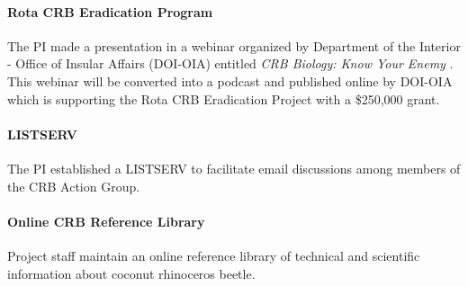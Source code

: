 \documentclass[12pt,letterpaper,english,bibliography=totocnumbered,abstract=on]{scrartcl}
\begin{document}
\paragraph{Rota CRB Eradication Program}
The PI made a presentation in a webinar organized by Department of the Interior - Office of Insular Affairs (DOI-OIA) entitled \textit{CRB Biology: Know Your Enemy} \cite{mooreCRBBiologyKnow2021}. This webinar will be converted into a podcast and published online by DOI-OIA which is supporting the Rota CRB Eradication Project with a \$250,000 grant.

\paragraph{LISTSERV}
The PI established a LISTSERV to facilitate email discussions among members of the CRB Action Group.\cite{mooreOnlineEmailDiscussion2021}

\paragraph{Online CRB Reference Library}
Project staff maintain an online reference library of technical and scientific information about coconut rhinoceros beetle.\cite{mooreOnlineReferenceLibrary2021}
\end{document}
